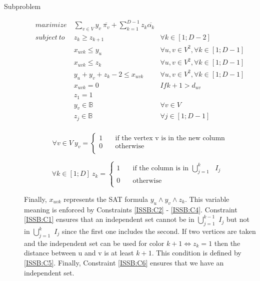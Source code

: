 \begin{description}
\item[Subproblem]
\begin{align}
maximize\   &  \displaystyle\sum_{v \in V} y_{v}\ \overline{\pi_v} + \displaystyle\sum_{k=1}^{D-1} z_{k} \overline{\alpha_k}   &   \label{ISSB:FE}\\
subject\ to\ & z_k \geq  z_{k+1} & \forall k \in [1;D-2]  \label{ISSB:C1} \\ 
& x_{uvk}  \leq y_u & \forall u,v \in V^{2}, \forall k \in [1;D-1] \label{ISSB:C2} \\
& x_{uvk}  \leq z_k & \forall u,v \in V^{2}, \forall k \in [1;D-1] \label{ISSB:C3} \\
& y_u + y_v + z_k - 2 \leq x_{uvk}  & \forall u,v \in V^{2}, \forall k \in [1;D-1] \label{ISSB:C4} \\
& x_{uvk} = 0 & If k + 1 > d_{uv} \label{ISSB:C5} \\
&  z_1  = 1 & \label{ISSB:C6}\\
&  y_{v} \in \mathbb{B} &  \forall v \in V \\ 
&  z_{j} \in \mathbb{B} &  \forall j \in [1;D-1] \\ 
\end{align}


\[ \forall v \in V\ y_{v} =
  \begin{cases}
    1       & \quad \text{if the vertex v is in the new column}  \\
    0  		& \quad \text{otherwise }\\
  \end{cases}
\]

\[ \forall k \in [1;D]\ z_{k} =
  \begin{cases}
    1       & \quad \text{if the column is in\ $\bigcup_{j=1}^{k}$ $I_{j}$ }  \\
    0  		& \quad \text{otherwise }\\
  \end{cases}
\]

Finally, $x_{uvk}$ represents the SAT formula $y_u \land y_v \land z_k$. This variable meaning is enforced by Constraints \ref{ISSB:C2} -  \ref{ISSB:C4}. Constraint  \ref{ISSB:C1} ensures that an independent set cannot be in $\bigcup_{j=1}^{k-1}$ $I_{j}$ but not in $\bigcup_{j=1}^{k}$ $I_{j}$ since the first one includes the second. If two vertices are taken and the independent set can be used for color $k+1 \iff z_k = 1$ then the distance between u and v is at least $k+1$. This condition is defined by \ref{ISSB:C5}. Finally, Constraint \ref{ISSB:C6} ensures that we have an independent set.

\end{description}





